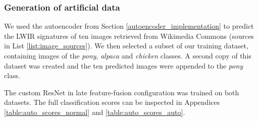 \documentclass{l4proj}
\begin{document}
\subsubsection{Generation of artificial data}

We used the autoencoder from Section \ref{autoencoder_implementation} to predict the LWIR signatures of ten images retrieved from Wikimedia Commons (sources in List \ref{list:image_sources}). We then selected a subset of our training dataset, containing images of the \textit{pony}, \textit{alpaca} and \textit{chicken} classes. A second copy of this dataset was created and the ten predicted images were appended to the \textit{pony} class.

The custom ResNet in late feature-fusion configuration was trained on both datasets. The full classification scores can be inspected in Appendices \ref{table:auto_scores_normal} and \ref{table:auto_scores_auto}. 
\end{document}
